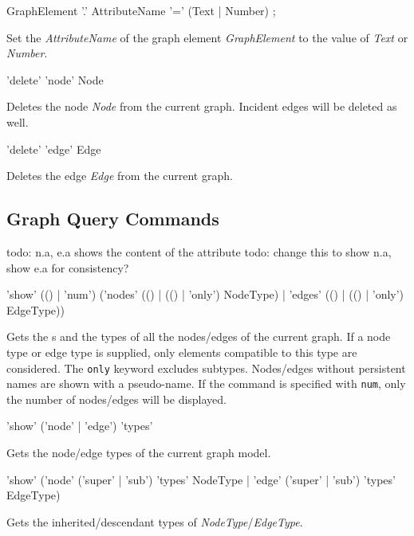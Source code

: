 \begin{rail}
  GraphElement '.' AttributeName '=' (Text | Number) ;
\end{rail}
Set the  \emph{AttributeName} of the graph element \emph{GraphElement} to the value of \emph{Text} or \emph{Number}.

\begin{rail}
  'delete' 'node' Node
\end{rail}
Deletes the node \emph{Node} from the current graph. Incident edges will be deleted as well.

\begin{rail}
  'delete' 'edge' Edge
\end{rail}
Deletes the edge \emph{Edge} from the current graph.

  
\subsection{Graph Query Commands}

todo: n.a, e.a shows the content of the attribute
todo: change this to show n.a, show e.a for consistency?

\begin{rail}
  'show' (() | 'num') ('nodes' (() | (() | 'only') NodeType) | 'edges' (() | (() | 'only') EdgeType))
\end{rail}
Gets the s and the types of all the nodes/edges of the current graph. 
If a node type or edge type is supplied, only elements compatible to this type are considered. 
The \texttt{only} keyword excludes subtypes. Nodes/edges without persistent names are shown with a pseudo-name.
If the command is specified with \texttt{num}, only the number of nodes/edges will be displayed.

\begin{rail}
  'show' ('node' | 'edge') 'types'
\end{rail}
Gets the node/edge types of the current graph model.

\begin{rail}
'show' ('node' ('super' | 'sub') 'types' NodeType | 'edge' ('super' | 'sub') 'types' EdgeType)
\end{rail}
Gets the inherited/descendant types of \emph{NodeType}/\emph{EdgeType}.

